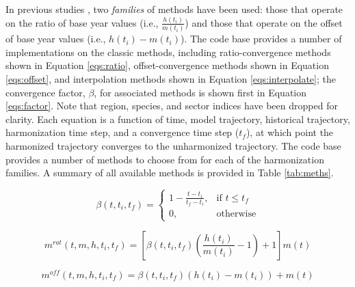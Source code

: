 In previous studies \cite{meinshausen_rcp_2011,rogelj_discrepancies_2011}, two
\textit{families} of methods have been used: those that operate on the ratio of
base year values (i.e., $\frac{h(t_i)}{m(t_i)}$) and those that operate on the
offset of base year values (i.e., $h(t_i) - m(t_i)$). The  code
base provides a number of implementations on the classic methods, including
% 
% 
ratio-convergence methods shown in Equation \ref{eqs:ratio}, offset-convergence
methods shown in Equation \ref{eqs:offset}, and interpolation methods shown in
Equation \ref{eqs:interpolate}; the convergence factor, $\beta$, for associated
methods is shown first in Equation \ref{eqs:factor}. Note that region, species,
and sector indices have been dropped for clarity. Each equation is a function of
time, model trajectory, historical trajectory, harmonization time step, and a
convergence time step ($t_f$), at which point the harmonized trajectory
converges to the unharmonized trajectory. The  code base provides a
number of methods to choose from for each of the harmonization families. A
summary of all available methods is provided in Table \ref{tab:meths}.
% 
% 


\begin{equation}\label{eqs:factor}
  \beta(t, t_i, t_f) =
  \begin{cases}
    1 - \frac{t - t_i}{t_f - t_i},& \text{if } t \leq t_f\\
    0,                        & \text{otherwise}
  \end{cases}
\end{equation}

\begin{equation}\label{eqs:ratio}
  m^{rat}(t, m, h, t_i, t_f) = [\beta(t, t_i, t_f) (\frac{h(t_i)}{m(t_i)} - 1) + 1] m(t)
\end{equation}

\begin{equation}\label{eqs:offset}
  m^{off}(t, m, h, t_i, t_f) = \beta(t, t_i, t_f) (h(t_i) - m(t_i)) + m(t)
\end{equation}
  
